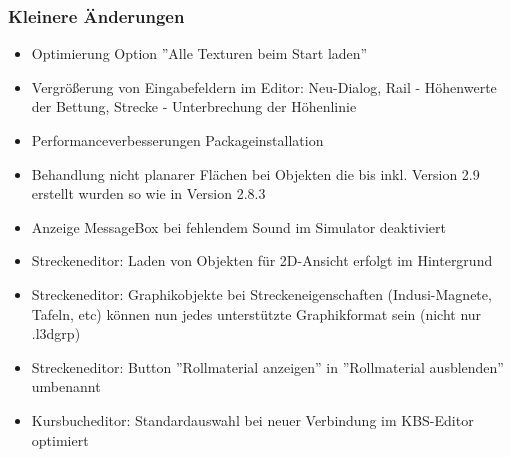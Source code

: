 \subsubsection{Kleinere Änderungen}
\begin{itemize}
\item Optimierung Option ''Alle Texturen beim Start laden''
\item Vergrößerung von Eingabefeldern im Editor: Neu-Dialog, Rail - Höhenwerte der Bettung, Strecke - Unterbrechung der Höhenlinie
\item Performanceverbesserungen Packageinstallation
\item Behandlung nicht planarer Flächen bei Objekten die bis inkl. Version 2.9 erstellt wurden so wie in Version 2.8.3
\item Anzeige MessageBox bei fehlendem Sound im Simulator deaktiviert

\item Streckeneditor: Laden von Objekten für 2D-Ansicht erfolgt im Hintergrund
\item Streckeneditor: Graphikobjekte bei Streckeneigenschaften (Indusi-Magnete, Tafeln, etc) können nun jedes unterstützte Graphikformat sein (nicht nur .l3dgrp)
\item Streckeneditor: Button ''Rollmaterial anzeigen'' in ''Rollmaterial ausblenden'' umbenannt

\item Kursbucheditor: Standardauswahl bei neuer Verbindung im KBS-Editor optimiert
\end{itemize}

